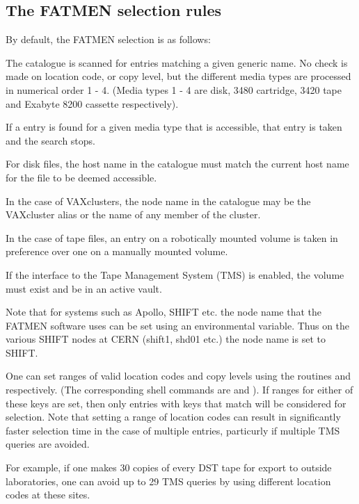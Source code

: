 \subsection{The FATMEN selection rules}
\par
By default, the FATMEN selection is as follows:
\begin{OL}
\item
The catalogue is scanned for entries matching a given generic
name. No check is made on location code, or copy level,
but the different media types are processed in numerical order
1 - 4. (Media types 1 - 4 are disk, 3480 cartridge, 3420 tape
and Exabyte 8200 cassette respectively).
\item
If a entry is found for a given media type that is accessible,
that entry is taken and the search stops.
\item
For disk files, the host name in the catalogue must match
the current host name for the file to be deemed accessible.
\item
In the case of VAXclusters, the node name in the catalogue
may be the VAXcluster alias or the name of any member of 
the cluster.
\item
In the case of tape files, an entry on a robotically mounted 
volume is taken in preference over one on a manually mounted
volume.
\item
If the interface to the Tape Management System (TMS) is enabled,
the volume must exist and be in an active vault.
\end{OL}
\par
Note that for systems such as Apollo, SHIFT etc. the node name
that the FATMEN software uses can be set using an environmental
variable. Thus on the various SHIFT nodes at CERN (shift1, shd01 etc.)
the node name is set to SHIFT.
\par
One can set ranges of valid location codes and copy levels using
the routines  and  respectively. (The corresponding
shell commands are  and ). If ranges
for either of these keys are set, then only entries with
keys that match will be considered for selection. 
Note that setting a range of location codes can result in
significantly faster selection time in the case of multiple
entries, particurly if multiple TMS queries are avoided.
\par
For example, if one makes 30 copies of every DST tape for
export to outside laboratories, one can avoid up to 29 
TMS queries by using different location codes at these
sites.
\par

